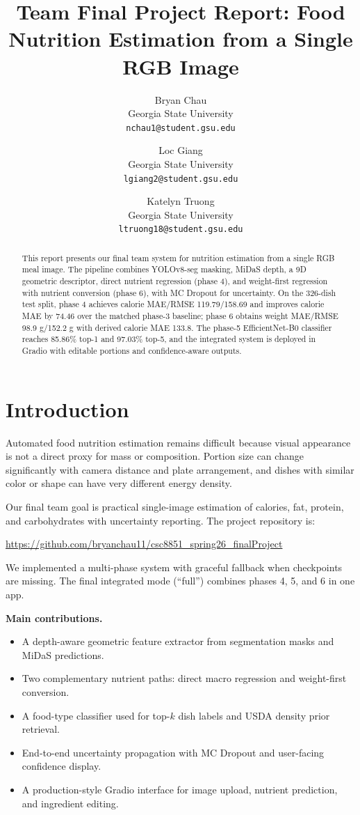 \documentclass[10pt,twocolumn,letterpaper]{article}
\title{Team Final Project Report: Food Nutrition Estimation from a Single RGB Image}
\author{
Bryan Chau\\
Georgia State University\\
\texttt{nchau1@student.gsu.edu}
\and
Loc Giang\\
Georgia State University\\
\texttt{lgiang2@student.gsu.edu}
\and
Katelyn Truong\\
Georgia State University\\
\texttt{ltruong18@student.gsu.edu}
}
\date{}
\begin{document}
\maketitle

\begin{abstract}
This report presents our final team system for nutrition estimation from a single RGB meal image. The pipeline combines YOLOv8-seg masking, MiDaS depth, a 9D geometric descriptor, direct nutrient regression (phase 4), and weight-first regression with nutrient conversion (phase 6), with MC Dropout for uncertainty. On the 326-dish test split, phase 4 achieves calorie MAE/RMSE 119.79/158.69 and improves calorie MAE by 74.46 over the matched phase-3 baseline; phase 6 obtains weight MAE/RMSE 98.9 g/152.2 g with derived calorie MAE 133.8. The phase-5 EfficientNet-B0 classifier reaches 85.86\% top-1 and 97.03\% top-5, and the integrated system is deployed in Gradio with editable portions and confidence-aware outputs.
\end{abstract}

\section{Introduction}
Automated food nutrition estimation remains difficult because visual appearance is not a direct proxy for mass or composition. Portion size can change significantly with camera distance and plate arrangement, and dishes with similar color or shape can have very different energy density.

Our final team goal is practical single-image estimation of calories, fat, protein, and carbohydrates with uncertainty reporting. The project repository is:
\begin{center}
\url{https://github.com/bryanchau11/csc8851_spring26_finalProject}
\end{center}

We implemented a multi-phase system with graceful fallback when checkpoints are missing. The final integrated mode (``full'') combines phases 4, 5, and 6 in one app.

\textbf{Main contributions.}
\begin{itemize}
\item A depth-aware geometric feature extractor from segmentation masks and MiDaS predictions.
\item Two complementary nutrient paths: direct macro regression and weight-first conversion.
\item A food-type classifier used for top-$k$ dish labels and USDA density prior retrieval.
\item End-to-end uncertainty propagation with MC Dropout and user-facing confidence display.
\item A production-style Gradio interface for image upload, nutrient prediction, and ingredient editing.
\end{itemize}
\end{document}

